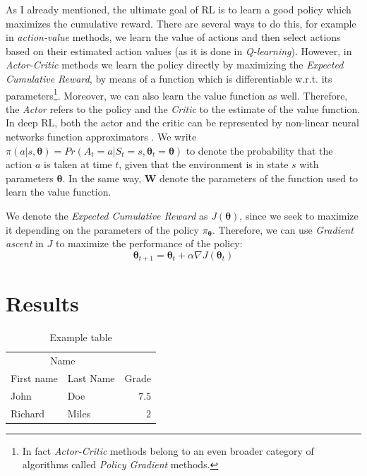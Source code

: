 \documentclass[twoside,twocolumn]{article}
\begin{document}
As I already mentioned, the ultimate goal of RL is to learn a good policy which maximizes the cumulative reward. There are several ways to do this, for example
in \emph{action-value} methods, we learn the value of actions and then select actions based on their estimated action values \cite{Sutton1998} (as it is done in \textit{Q-learning}). However, in \emph{Actor-Critic} methods we learn the policy directly by maximizing the \emph{Expected Cumulative Reward}, by means of a function which is differentiable w.r.t. its parameters\footnote{In fact \emph{Actor-Critic} methods belong to an even broader category of algorithms called \emph{Policy Gradient} methods.}. Moreover, we can also learn the value function as well.
Therefore, the \emph{Actor} refers to the policy and the \emph{Critic} to the estimate of the value function. In deep RL, both the actor and the critic can be represented by non-linear neural networks function approximators \cite{mnih2016asynchronous}.
We write $\pi(a|s,\boldsymbol{\theta}) = Pr(A_t=a | S_t=s, \boldsymbol{\theta}_t=\boldsymbol{\theta})$ to denote the probability that the action $a$ is taken at time $t$, given that the environment is in state $s$ with parameters $\boldsymbol{\theta}$. In the same way, $\boldsymbol{W}$ denote the parameters of the function used to learn the value function.

We denote the \emph{Expected Cumulative Reward} as $J(\boldsymbol{\theta})$, since we seek to maximize it depending on the parameters of the policy $\pi_{\boldsymbol{\theta}}$. Therefore, we can use \emph{Gradient ascent} in $J$ to maximize the performance of the policy:
\begin{equation}
  \boldsymbol{\theta}_{t+1} = \boldsymbol{\theta}_{t} + \alpha \nabla J(\boldsymbol{\theta}_t)
\end{equation}






\section{Results}

\begin{table}
\caption{Example table}
\centering
\begin{tabular}{llr}
\toprule
\multicolumn{2}{c}{Name} \\
\cmidrule(r){1-2}
First name & Last Name & Grade \\
\midrule
John & Doe & $7.5$ \\
Richard & Miles & $2$ \\
\bottomrule
\end{tabular}
\end{table}
\end{document}
